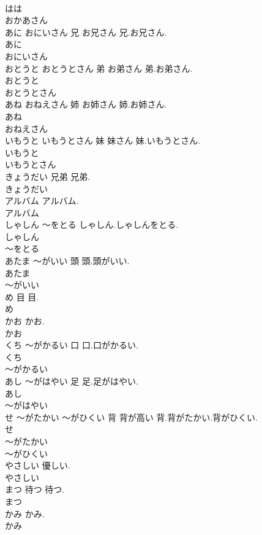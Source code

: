 \documentclass[8pt]{extreport}
\begin{document}
\begin{CJK}{UTF8}{min}
\\	はは
\\	おかあさん
\\	あに おにいさん	兄 お兄さん	兄.お兄さん.	
\\	あに
\\	おにいさん
\\	おとうと おとうとさん	弟 お弟さん	弟.お弟さん.	
\\	おとうと
\\	おとうとさん
\\	あね おねえさん	姉 お姉さん	姉.お姉さん.	
\\	あね
\\	おねえさん
\\	いもうと いもうとさん	妹 妹さん	妹.いもうとさん.	
\\	いもうと
\\	いもうとさん
\\	きょうだい	兄弟	兄弟.	
\\	きょうだい
\\	アルバム		アルバム.	
\\	アルバム
\\	しゃしん ～をとる		しゃしん.しゃしんをとる.	
\\	しゃしん
\\	～をとる
\\	あたま ～がいい	頭	頭.頭がいい.	
\\	あたま
\\	～がいい
\\	め	目	目.	
\\	め
\\	かお		かお.	
\\	かお
\\	くち ～がかるい	口	口.口がかるい.	
\\	くち
\\	～がかるい
\\	あし ～がはやい	足	足.足がはやい.	
\\	あし
\\	～がはやい
\\	せ ～がたかい ～がひくい	背 背が高い	背.背がたかい.背がひくい.	
\\	せ
\\	～がたかい
\\	～がひくい
\\	やさしい		優しい.	
\\	やさしい
\\	まつ	待つ	待つ.	
\\	まつ
\\	かみ		かみ.	
\\	かみ

\end{CJK}
\end{document}
